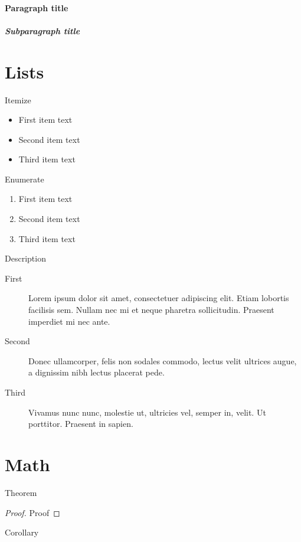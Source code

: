 \documentclass[english,counters by chapter]{uniud}
\begin{document}
\blindtext

\paragraph{Paragraph title}

\blindtext

\subparagraph{Subparagraph title}

\blindtext

\section{Lists}


Itemize
\begin{itemize}
\item First item text
\item Second item text
\item Third item text
\end{itemize}
Enumerate
\begin{enumerate}
\item First item text
\item Second item text
\item Third item text
\end{enumerate}
Description
\begin{description}
\item[First] 
	Lorem ipsum dolor sit amet, consectetuer adipiscing elit. Etiam lobortis facilisis sem. Nullam nec mi et neque pharetra sollicitudin. Praesent imperdiet mi nec ante.
\item[Second] 
	 Donec ullamcorper, felis non sodales commodo, lectus velit ultrices augue, a dignissim nibh lectus placerat pede.
\item[Third] 
	Vivamus nunc nunc, molestie ut, ultricies vel, semper in, velit. Ut porttitor. Praesent in sapien.
\end{description}


\section{Math}

\begin{theorem}
	\label{thm:first}
	Theorem
\end{theorem}
\begin{proof}
	Proof
\end{proof}

\begin{corollary}
	\label{cor:first}
	Corollary
\end{corollary}
\end{document}
